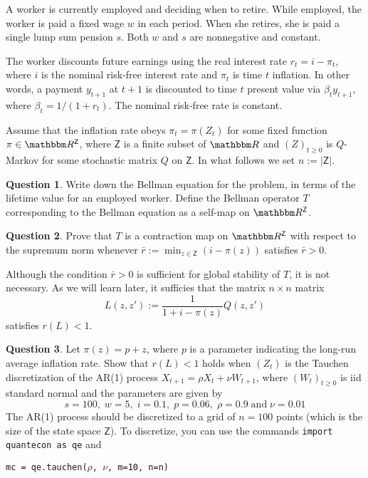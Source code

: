 \documentclass[12pt]{article}
\newcommand{\1}{\mathbbm 1}
\newcommand{\RR}{\mathbbm R}
\newcommand{\Zsf}{\mathsf Z}
\theoremstyle{definition}
\newtheorem{question}{Question}
\begin{document}
\newpage

A worker is currently employed and deciding when to retire.  While
employed, the worker is paid a fixed wage $w$ in each period.  When she
retires, she is paid a single lump sum pension $s$.  Both $w$ and $s$
are nonnegative and constant.  

The worker discounts future earnings using the real interest rate $r_t = i -
\pi_t$, where $i$ is the nominal risk-free interest rate and $\pi_t$ is time
$t$ inflation.  In other words, a payment $y_{t+1}$ at $t+1$
is discounted to time $t$
present value via $\beta_t y_{t+1}$, where $\beta_t = 1/(1 + r_t)$.  The
nominal risk-free rate is constant.

Assume that the inflation rate obeys $\pi_t = \pi(Z_t)$ for some fixed
function $\pi \in \RR^\Zsf$, where $\Zsf$ is a finite subset of $\RR$ and
$(Z)_{t \geq 0}$ is $Q$-Markov for some stochastic matrix $Q$ on $\Zsf$.
In what follows we set $n := |\Zsf|$.


\begin{question}
    Write down the Bellman equation for the problem, in terms of the lifetime
    value for an employed worker.  Define the Bellman operator $T$
    corresponding to the Bellman equation as a self-map on $\RR^\Zsf$. 
\end{question}

\begin{question}
    Prove that $T$ is a contraction map on $\RR^\Zsf$ with respect to the
    supremum norm whenever $\bar r := \min_{z \in \Zsf} (i - \pi(z))$
    satisfies $\bar r > 0$.
\end{question}

Although the condition $\bar r > 0$ is sufficient for global stability of $T$,
it is not necessary.  As we will learn later, it sufficies that the matrix
$n \times n$ matrix
%
\begin{equation*}
    L(z, z') := \frac{1}{1 + i - \pi(z)} Q(z, z')
\end{equation*}
%
satisfies $r(L) < 1$.  

\begin{question}
    Let $\pi(z) = p + z$, where $p$ is a parameter indicating the long-run
    average inflation rate.  Show that $r(L) < 1$ holds when $(Z_t)$ is
    the Tauchen discretization of the AR(1) process $X_{t+1} = \rho X_t + \nu
    W_{t+1}$, where $(W_t)_{t \geq 0}$ is {\sc iid} standard normal and
    the parameters are given by
    \begin{equation}\label{eq:dp}
        s = 100, \;
        w = 5,   \;
        i = 0.1,\;
        p = 0.06,\;
        \rho = 0.9 \; \text{and} \;
        \nu = 0.01
    \end{equation}
    The AR(1) process should be discretized to a grid of $n = 100$ points
    (which is the size of the state space $\Zsf$).  To discretize, 
    you can use the commands \texttt{import quantecon as qe} and
    \begin{center}
        \texttt{mc = qe.tauchen($\rho$, $\nu$, m=10, n=n)}
    \end{center}
\end{question}
\end{document}
